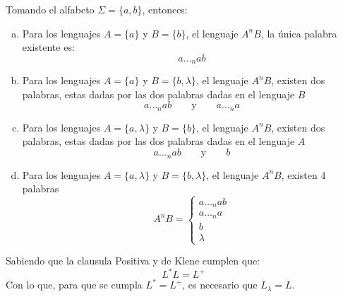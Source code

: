 





\begin{mdframed}[style = warning]
	\begin{problem}
		Tomando el alfabeto $\Sigma = \{ a,b \}$, entonces:
			\begin{enumerate}[a)]
				\item Para los lenguajes $A = \{ a \}$ y $B = \{ b \}$, el lenguaje $A^n B$, la única palabra existente es:
					$$\boxed{a\ldots _n ab}$$
				\item Para los lenguajes $A = \{ a \}$ y $B = \{ b,\lambda \}$, el lenguaje $A^n B$, existen dos palabras, estas dadas por las dos palabras dadas en el lenguaje $B$
					$$\boxed{a\ldots _n ab \quad \quad \text{y} \quad \quad a\ldots _n a}$$
				\item Para los lenguajes $A = \{ a,\lambda \}$ y $B = \{ b \}$, el lenguaje $A^n B$, existen dos palabras, estas dadas por las dos palabras dadas en el lenguaje $A$
					$$\boxed{a\ldots _n ab \quad \quad \text{y} \quad \quad b}$$
				\item Para los lenguajes $A = \{ a,\lambda \}$ y $B = \{ b,\lambda \}$, el lenguaje $A^n B$, existen $4$ palabras
					$$
					A^n B = 
					\left\{ \begin{array}{c}
						a\ldots _n a b\\
						a\ldots _n a \\
						b \\
						\lambda
					\end{array}\right.										
					$$
			\end{enumerate}
	\end{problem}
\end{mdframed}









\begin{mdframed}[style = warning]
	\begin{problem}
		Sabiendo que la clausula Positiva y de Klene cumplen que:
			$$L^* L = L^+$$
		Con lo que, para que se cumpla $L^* = L^+$, es necesario que $\boxed{L_\lambda = L}$.
	\end{problem}
\end{mdframed}










